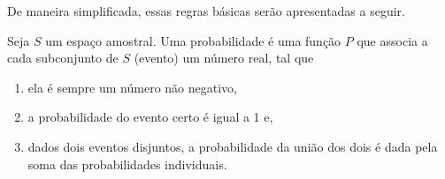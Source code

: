 De maneira simplificada, essas regras básicas serão apresentadas a seguir.

Seja \(S\) um espaço amostral. Uma probabilidade é uma função \(P\) que associa a cada subconjunto de \(S\) (evento)  um número real, tal que
\begin{enumerate}
\item {} 
ela é sempre um número não negativo,

\item {} 
a probabilidade do evento certo é igual a 1 e,

\item {} 
dados dois eventos disjuntos, a probabilidade da união dos dois é dada pela soma das probabilidades individuais.

\end{enumerate}

